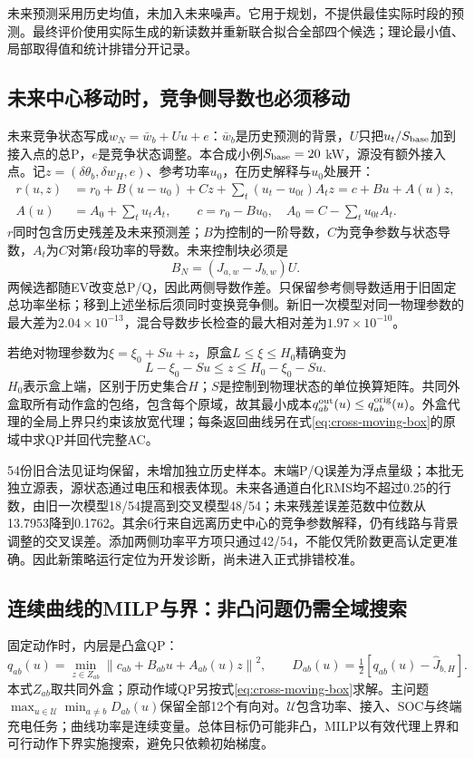 \documentclass[UTF8,fontset=fandol,11pt,a4paper]{ctexart}
\newcommand{\norm}[1]{\left\lVert#1\right\rVert}
\begin{document}
未来预测采用历史均值，未加入未来噪声。它用于规划，不提供最佳实际时段的预测。最终评价使用实际生成的新读数并重新联合拟合全部四个候选；理论最小值、局部取得值和统计排错分开记录。

\subsection{未来中心移动时，竞争侧导数也必须移动}
未来竞争状态写成$w_N=\bar w_b+Uu+e$：$\bar w_b$是历史预测的背景，$U$只把$u_t/S_{\rm base}$加到接入点的总P，$e$是竞争状态调整。本合成小例$S_{\rm base}=20$ kW，源没有额外接入点。记$z=(\delta\theta_b,\delta w_H,e)$、参考功率$u_0$，在历史解释与$u_0$处展开：
\begin{align}
 r(u,z)&=r_0+B(u-u_0)+Cz+\sum_t(u_t-u_{0t})A_tz
          =c+Bu+A(u)z,\label{eq:cross-residual}\\
 A(u)&=A_0+\sum_tu_tA_t,\qquad
 c=r_0-Bu_0,\quad A_0=C-\sum_tu_{0t}A_t.
\end{align}
$r$同时包含历史残差及未来预测差；$B$为控制的一阶导数，$C$为竞争参数与状态导数，$A_t$为$C$对第$t$段功率的导数。未来控制块必须是
\begin{equation}
 B_N=(J_{a,w}-J_{b,w})U.
\end{equation}
两候选都随EV改变总P/Q，因此两侧导数作差。只保留参考侧导数适用于旧固定总功率坐标；移到上述坐标后须同时变换竞争侧。新旧一次模型对同一物理参数的最大差为$2.04\times10^{-13}$，混合导数步长检查的最大相对差为$1.97\times10^{-10}$。

若绝对物理参数为$\xi=\xi_0+Su+z$，原盒$L\le\xi\le H_0$精确变为
\begin{equation}
 \boxed{L-\xi_0-Su\le z\le H_0-\xi_0-Su.}
 \label{eq:cross-moving-box}
\end{equation}
$H_0$表示盒上端，区别于历史集合$H$；$S$是控制到物理状态的单位换算矩阵。共同外盒取所有动作盒的包络，包含每个原域，故其最小成本$q_{ab}^{\rm out}(u)\le q_{ab}^{\rm orig}(u)$。外盒代理的全局上界只约束该放宽代理；每条返回曲线另在式\eqref{eq:cross-moving-box}的原域中求QP并回代完整AC。

54份旧合法见证均保留，未增加独立历史样本。末端P/Q误差为浮点量级；本批无独立源表，源状态通过电压和根表体现。未来各通道白化RMS均不超过0.25的行数，由旧一次模型18/54提高到交叉模型48/54；未来残差误差范数中位数从13.7953降到0.1762。其余6行来自远离历史中心的竞争参数解释，仍有线路与背景调整的交叉误差。添加两侧功率平方项只通过42/54，不能仅凭阶数更高认定更准确。因此新策略运行定位为开发诊断，尚未进入正式排错校准。

\subsection{连续曲线的MILP与界：非凸问题仍需全域搜索}
固定动作时，内层是凸盒QP：
\begin{equation}
 q_{ab}(u)=\min_{z\in Z_{ab}}\norm{c_{ab}+B_{ab}u+A_{ab}(u)z}^2,
 \qquad D_{ab}(u)=\tfrac12[q_{ab}(u)-\hat J_{b,H}].
 \label{eq:cross-qp}
\end{equation}
本式$Z_{ab}$取共同外盒；原动作域QP另按式\eqref{eq:cross-moving-box}求解。主问题$\max_{u\in\mathcal U}\min_{a\ne b}D_{ab}(u)$保留全部12个有向对。$\mathcal U$包含功率、接入、SOC与终端充电任务；曲线功率是连续变量。总体目标仍可能非凸，MILP以有效代理上界和可行动作下界实施搜索，避免只依赖初始梯度。
\end{document}
